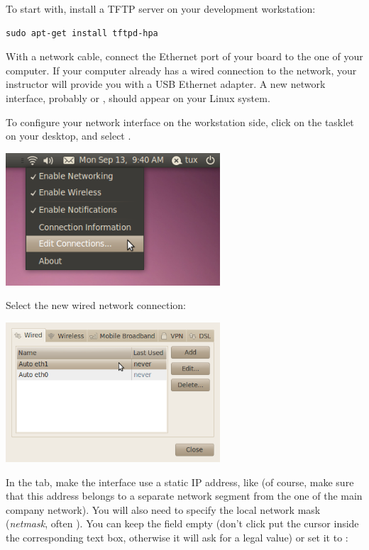 To start with, install a TFTP server on your development workstation:

\begin{verbatim}
sudo apt-get install tftpd-hpa
\end{verbatim}

With a network cable, connect the Ethernet port of your board to the
one of your computer. If your computer already has a wired connection
to the network, your instructor will provide you with a USB Ethernet
adapter. A new network interface, probably  or ,
should appear on your Linux system.

To configure your network interface on the workstation side, click on
the  tasklet on your desktop, and select
.

\begin{center}
\includegraphics[width=8cm]{labs/kernel-board-setup/network-config-1.png}
\end{center}

Select the new wired network connection:

\begin{center}
\includegraphics[width=8cm]{labs/kernel-board-setup/network-config-2.png}
\end{center}

In the  tab, make the interface use a static IP
address, like  (of course, make sure that this address
belongs to a separate network segment from the one of the main company
network). You will also need to specify the local network mask
(\emph{netmask}, often ). You can keep the
 field empty (don't click put the cursor inside the
corresponding text box, otherwise it will ask for a legal value)
or set it to :

